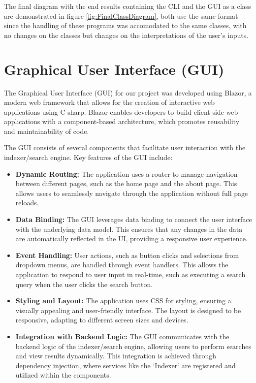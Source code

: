 \documentclass{article}
\begin{document}
The final diagram with the end results containing the CLI and the GUI as a class are demonstrated in figure \ref*{fig:FinalClassDiagram}, both use the same format since the handling of these programs was accomodated to the same classes, with no changes on the classes but changes on the interpretations of the user's inputs.

\section{Graphical User Interface (GUI)}
The Graphical User Interface (GUI) for our project was developed using Blazor, a modern web framework that allows for the creation of interactive web applications using C sharp. Blazor enables developers to build client-side web applications with a component-based architecture, which promotes reusability and maintainability of code.

The GUI consists of several components that facilitate user interaction with the indexer/search engine. Key features of the GUI include:

\begin{itemize}
    \item \textbf{Dynamic Routing:} The application uses a router to manage navigation between different pages, such as the home page and the about page. This allows users to seamlessly navigate through the application without full page reloads.
    \item \textbf{Data Binding:} The GUI leverages data binding to connect the user interface with the underlying data model. This ensures that any changes in the data are automatically reflected in the UI, providing a responsive user experience.
    \item \textbf{Event Handling:} User actions, such as button clicks and selections from dropdown menus, are handled through event handlers. This allows the application to respond to user input in real-time, such as executing a search query when the user clicks the search button.
    \item \textbf{Styling and Layout:} The application uses CSS for styling, ensuring a visually appealing and user-friendly interface. The layout is designed to be responsive, adapting to different screen sizes and devices.
    \item \textbf{Integration with Backend Logic:} The GUI communicates with the backend logic of the indexer/search engine, allowing users to perform searches and view results dynamically. This integration is achieved through dependency injection, where services like the `Indexer` are registered and utilized within the components.
\end{itemize}
\end{document}

